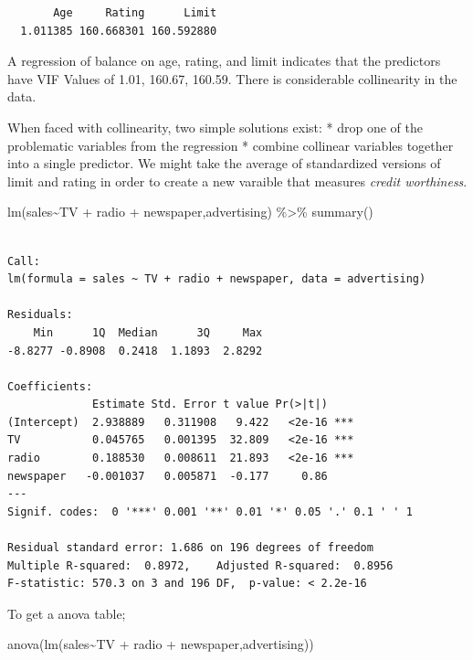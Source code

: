 \documentclass[
  letterpaper,
  DIV=11,
  numbers=noendperiod]{scrreprt}
\newenvironment{Shaded}{\begin{snugshade}}{\end{snugshade}}
\newcommand{\FunctionTok}[1]{\textcolor[rgb]{0.02,0.16,0.49}{#1}}
\newcommand{\NormalTok}[1]{\textcolor[rgb]{0.33,0.33,0.33}{#1}}
\newcommand{\SpecialCharTok}[1]{\textcolor[rgb]{0.00,0.46,0.62}{#1}}
\begin{document}
\begin{verbatim}
       Age     Rating      Limit 
  1.011385 160.668301 160.592880 
\end{verbatim}

A regression of balance on age, rating, and limit indicates that the
predictors have VIF Values of 1.01, 160.67, 160.59. There is
considerable collinearity in the data.

When faced with collinearity, two simple solutions exist: * drop one of
the problematic variables from the regression * combine collinear
variables together into a single predictor. We might take the average of
standardized versions of limit and rating in order to create a new
varaible that measures \emph{credit worthiness}.

\begin{Shaded}
\begin{Highlighting}[]
\FunctionTok{lm}\NormalTok{(sales}\SpecialCharTok{\textasciitilde{}}\NormalTok{TV }\SpecialCharTok{+}\NormalTok{ radio }\SpecialCharTok{+}\NormalTok{ newspaper,advertising) }\SpecialCharTok{\%\textgreater{}\%} \FunctionTok{summary}\NormalTok{()}
\end{Highlighting}
\end{Shaded}

\begin{verbatim}

Call:
lm(formula = sales ~ TV + radio + newspaper, data = advertising)

Residuals:
    Min      1Q  Median      3Q     Max 
-8.8277 -0.8908  0.2418  1.1893  2.8292 

Coefficients:
             Estimate Std. Error t value Pr(>|t|)    
(Intercept)  2.938889   0.311908   9.422   <2e-16 ***
TV           0.045765   0.001395  32.809   <2e-16 ***
radio        0.188530   0.008611  21.893   <2e-16 ***
newspaper   -0.001037   0.005871  -0.177     0.86    
---
Signif. codes:  0 '***' 0.001 '**' 0.01 '*' 0.05 '.' 0.1 ' ' 1

Residual standard error: 1.686 on 196 degrees of freedom
Multiple R-squared:  0.8972,    Adjusted R-squared:  0.8956 
F-statistic: 570.3 on 3 and 196 DF,  p-value: < 2.2e-16
\end{verbatim}

To get a anova table;

\begin{Shaded}
\begin{Highlighting}[]
\FunctionTok{anova}\NormalTok{(}\FunctionTok{lm}\NormalTok{(sales}\SpecialCharTok{\textasciitilde{}}\NormalTok{TV }\SpecialCharTok{+}\NormalTok{ radio }\SpecialCharTok{+}\NormalTok{ newspaper,advertising))}
\end{Highlighting}
\end{Shaded}
\end{document}
